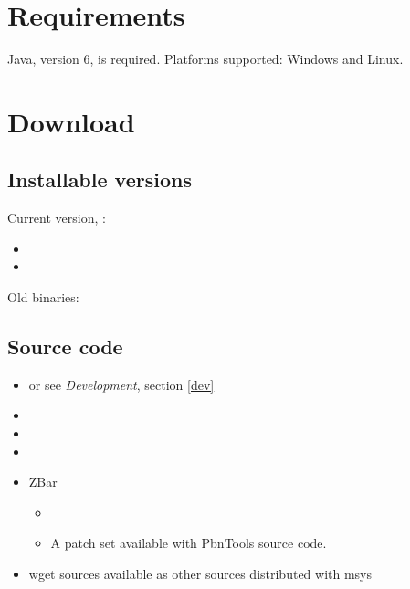 \documentclass[polish,a4paper,11pt,oneside]{article}
\begin{document}

\section{Requirements}

Java, version 6, is required. Platforms supported: Windows and Linux.

\section{Download} \label{download}

\subsection{Installable versions} \label{downloadBin}

Current version, \version{}:

\begin{itemize}
\item
\item

\end{itemize}

Old binaries:
\oldBinaries

\subsection{Source code} \label{downloadSrc}

\begin{itemize}
\item
  \pbntoolsSourceLinks
  or see {\em Development}, section \ref{dev}
\item
\item
  \jsoupSourceLinks
\item
  \logbackSourceLinks
\item
  ZBar
  \begin{itemize}
  \item
  \item
    A patch set available with PbnTools source code.
  \end{itemize}

\item
  wget sources available as other sources distributed with msys

\end{itemize}
\end{document}
